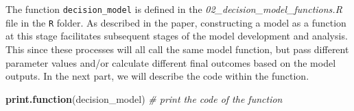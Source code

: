 \documentclass[]{book}
\newenvironment{Shaded}{\begin{snugshade}}{\end{snugshade}}
\newcommand{\CommentTok}[1]{\textcolor[rgb]{0.56,0.35,0.01}{\textit{#1}}}
\newcommand{\KeywordTok}[1]{\textcolor[rgb]{0.13,0.29,0.53}{\textbf{#1}}}
\newcommand{\NormalTok}[1]{#1}
\begin{document}
The function \texttt{decision\_model} is defined in the \emph{02\_decision\_model\_functions.R} file in the \texttt{R} folder. As described in the paper, constructing a model as a function at this stage facilitates subsequent stages of the model development and analysis. This since these processes will all call the same model function, but pass different parameter values and/or calculate different final outcomes based on the model outputs. In the next part, we will describe the code within the function.

\begin{Shaded}
\begin{Highlighting}[]
\KeywordTok{print.function}\NormalTok{(decision_model) }\CommentTok{# print the code of the function}
\end{Highlighting}
\end{Shaded}
\end{document}
